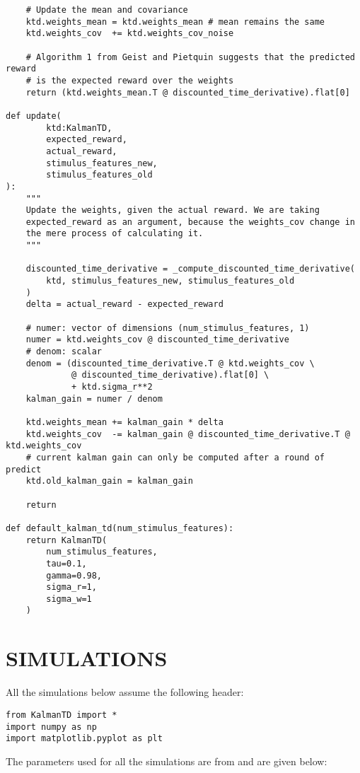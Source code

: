 \documentclass[11pt]{article}
\begin{document}
\begin{verbatim}
    # Update the mean and covariance
    ktd.weights_mean = ktd.weights_mean # mean remains the same
    ktd.weights_cov  += ktd.weights_cov_noise

    # Algorithm 1 from Geist and Pietquin suggests that the predicted reward
    # is the expected reward over the weights
    return (ktd.weights_mean.T @ discounted_time_derivative).flat[0]

def update(
        ktd:KalmanTD,
        expected_reward,
        actual_reward,
        stimulus_features_new,
        stimulus_features_old
):
    """
    Update the weights, given the actual reward. We are taking
    expected_reward as an argument, because the weights_cov change in
    the mere process of calculating it.
    """

    discounted_time_derivative = _compute_discounted_time_derivative(
        ktd, stimulus_features_new, stimulus_features_old
    )
    delta = actual_reward - expected_reward

    # numer: vector of dimensions (num_stimulus_features, 1)
    numer = ktd.weights_cov @ discounted_time_derivative
    # denom: scalar
    denom = (discounted_time_derivative.T @ ktd.weights_cov \
             @ discounted_time_derivative).flat[0] \
             + ktd.sigma_r**2
    kalman_gain = numer / denom

    ktd.weights_mean += kalman_gain * delta
    ktd.weights_cov  -= kalman_gain @ discounted_time_derivative.T @ ktd.weights_cov
    # current kalman gain can only be computed after a round of predict
    ktd.old_kalman_gain = kalman_gain

    return

def default_kalman_td(num_stimulus_features):
    return KalmanTD(
        num_stimulus_features,
        tau=0.1,
        gamma=0.98,
        sigma_r=1,
        sigma_w=1
    )
\end{verbatim}

\section{SIMULATIONS}
\label{sec:org224bbc6}

All the simulations below assume the following header:

\begin{verbatim}
from KalmanTD import *
import numpy as np
import matplotlib.pyplot as plt
\end{verbatim}

The parameters used for all the simulations are from \cite{Gershman2015} and are given below:
\end{document}

